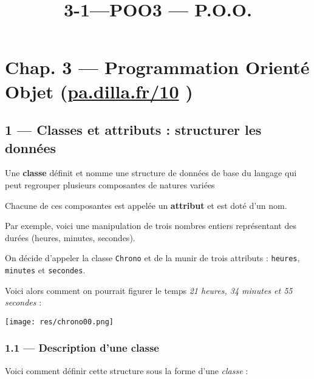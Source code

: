 \documentclass[a4paper,17pt]{extarticle}
\title{3-1---POO}
\begin{document}
    
    \title{3 --- P.O.O.}

    
    

    
    \hypertarget{chap.-3-programmation-orientuxe9-objet-pa.dilla.fr10}{%
\section{\texorpdfstring{Chap. 3 --- Programmation Orienté Objet
(\href{https://pa.dilla.fr/10}{pa.dilla.fr/10}
)}{Chap. 3 --- Programmation Orienté Objet (pa.dilla.fr/10 )}}\label{chap.-3-programmation-orientuxe9-objet-pa.dilla.fr10}}

    \hypertarget{classes-et-attributs-structurer-les-donnuxe9es}{%
\subsection{1 --- Classes et attributs : structurer les
données}\label{classes-et-attributs-structurer-les-donnuxe9es}}

    Une \textbf{classe} définit et nomme une structure de données de base du
langage qui peut regrouper plusieurs composantes de natures variées

    Chacune de ces composantes est appelée un \textbf{attribut} et est doté
d'un nom.

    Par exemple, voici une manipulation de trois nombres entiers
représentant des durées (heures, minutes, secondes).

On décide d'appeler la classe \texttt{Chrono} et de la munir de trois
attributs : \texttt{heures}, \texttt{minutes} et \texttt{secondes}.

Voici alors comment on pourrait figurer le temps \emph{21 heures, 34
minutes et 55 secondes} :

\texttt{[image: res/chrono00.png]}

    \hypertarget{description-dune-classe}{%
\subsubsection{1.1 --- Description d'une
classe}\label{description-dune-classe}}

    Voici comment définir cette structure sous la forme d'une \emph{classe}
:
\end{document}
